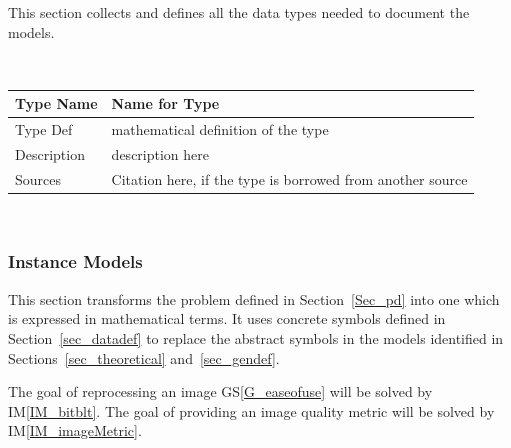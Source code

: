 \documentclass[12pt]{article}
\newcommand{\colAwidth}{0.13\textwidth}
\newcommand{\colBwidth}{0.82\textwidth}
\newcommand{\gsref}[1]{GS\ref{#1}}
\newcommand{\iref}[1]{IM\ref{#1}}
\begin{document}




This section collects and defines all the data types needed to document the
models. 

~\newline

\noindent
\begin{minipage}{\textwidth}
\renewcommand*{\arraystretch}{1.5}
\begin{tabular}{| p{\colAwidth} | p{\colBwidth}|}
  \hline
  \rowcolor[gray]{0.9}
  Type Name & Name for Type\\
  \hline
  Type Def & mathematical definition of the type\\
  \hline
  Description & description here
  \\
  \hline
  Sources & Citation here, if the type is borrowed from another source\\
  \hline
\end{tabular}
\end{minipage}\\

\subsubsection{Instance Models} \label{sec_instance}    

This section transforms the problem defined in Section~\ref{Sec_pd} into 
one which is expressed in mathematical terms. It uses concrete symbols defined 
in Section~\ref{sec_datadef} to replace the abstract symbols in the models 
identified in Sections~\ref{sec_theoretical} and~\ref{sec_gendef}.

The goal of reprocessing an image \gsref{G_easeofuse} will be solved by \iref{IM_bitblt}. The goal of providing an image quality metric will be solved by \iref{IM_imageMetric}.  
\end{document}
